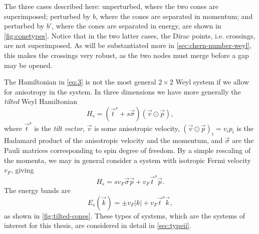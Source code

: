 The three cases described here: unperturbed, where the two cones are superimposed; perturbed by $b$, where the cones are separated in momentum; and perturbed by $b'$, where the cones are separated in energy, are shown in \cref{fig:conetypes}.
Notice that in the two latter cases, the Dirac points, i.e. crossings, are not superimposed.
As will be substantiated more in \cref{sec:chern-number-weyl}, this makes the crossings very robust, as the two nodes must merge before a gap may be opened.


The Hamiltonian in \cref{eq:3} is not the most general \( 2 \times 2 \) Weyl system if we allow for anisotropy in the system.
In three dimensions we have more generally the \emph{tilted} Weyl Hamiltonian
\begin{equation}
  \label{eq:4}
  H_s = (\vec{t}^{s} + s \vec{\sigma}) (\vec{v} \odot \vec{p}),
\end{equation}
where $\vec{t}^{s}$ is  the \emph{tilt vector}, $\vec{v}$ is some anisotropic velocity, $(\vec{v} \odot \vec{p})_i = v_i p_i$ is the Hadamard product of the anisotropic velocity and the momentum,  and $\vec{\sigma}$ are the Pauli matrices corresponding to spin degree of freedom.
By a simple rescaling of the momenta, we may in general consider a system with isotropic Fermi velocity \( v_F \), giving
\begin{equation}
  \label{eq:hamil-tilt-isotropic}
  H_s = s v_F \vec{\sigma} \vec{p} + v_F \vec{t}^s \vec{p}.
\end{equation}
The energy bands are
\begin{equation}
  \label{eq:tilted-eigenvalue}
  E_s(\vec{k}) = \pm v_F |k| + v_F \vec{t}^{s} \vec{k},
\end{equation}
as shown in \cref{fig:tilted-cones}.
These types of systems, which are the systems of interest for this thesis, are considered in detail in \cref{sec:typeii}.

